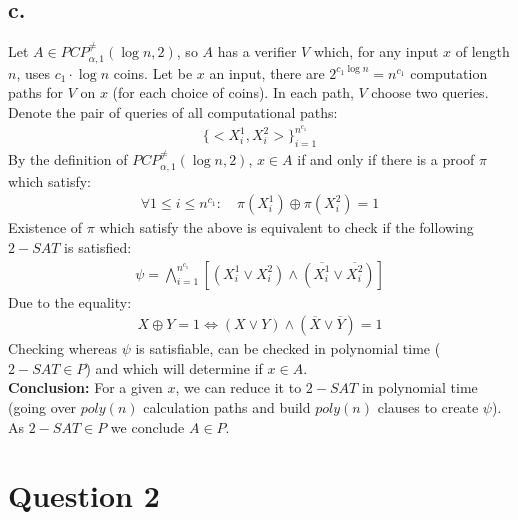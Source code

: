 \documentclass[11pt]{article}
\theoremstyle{plain}
\theoremstyle{nonumberplainnobrackets}
\begin{document}
\subsection*{c.} 
Let $A\in PCP_{\alpha,1}^{\ne} (\log n,2) $, so $A$ has a verifier $V$ which, for any input $x$ of length $n$, uses $c_1\cdot \log n$ coins. Let be $x$ an input, there are $2^{c_1\log n} = n^{c_1}$ computation paths for $V$ on $x$ (for each choice of coins). In each path, $V$ choose two queries. Denote the pair of queries of all computational paths:
\begin{align*}
\{ <X_i^1,X_i^2> \}_{i=1}^{n^{c_1}}
\end{align*} 
By the definition of $PCP_{\alpha,1}^{\ne} (\log n,2) $, $x\in A$ if and only if there is a proof $\pi$ which satisfy:
\begin{align*}
\forall 1\le i \le n^{c_1}: \quad\pi(X_i^1) \oplus \pi(X_i^2) =1
\end{align*}
Existence of $\pi$ which satisfy the above is equivalent to check if the following $2-SAT$ is satisfied:
\begin{align*}
\psi =\bigwedge_{i=1}^{n^{c_1}} [(X_i^1\vee X_i^2) \wedge (\overline{X_i^1} \vee \overline{X_i^2})]
\end{align*}
Due to the equality:
\begin{align*}
X\oplus Y = 1 \iff (X\vee Y) \wedge (\overline{X} \vee \overline{Y}) =1
\end{align*}
Checking whereas $\psi$ is satisfiable, can be checked in polynomial time ($2-SAT\in P$) and which will determine if $x\in A$.\\
\textbf{Conclusion: } For a given $x$, we can reduce it to $2-SAT$ in polynomial time (going over $poly(n)$ calculation paths and build $poly(n)$ clauses to create $\psi$). As $2-SAT\in P$ we conclude $A\in P$.
\section*{Question 2}
\end{document}
